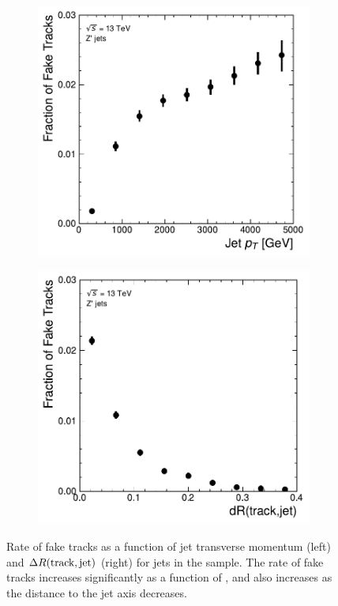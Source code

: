 \begin{figure}[!htbp]
  \centering
  \begin{subfigure}[b]{0.48\textwidth}
      \centering
      \includegraphics[width=\textwidth]{chapters/track_classifier/figs/fake_vs_pt.pdf}
  \end{subfigure}
  \quad
  \begin{subfigure}[b]{0.48\textwidth}
      \centering
      \includegraphics[width=\textwidth]{chapters/track_classifier/figs/fake_vs_dr.pdf}
  \end{subfigure}
  \caption{
    Rate of fake tracks as a function of jet transverse momentum (left) and $\Delta R(\textnormal{track}, \textnormal{jet})$ (right) for jets in the \Zprime sample.
    The rate of fake tracks increases significantly as a function of \pt, and also increases as the distance to the jet axis decreases.
  }
  \label{fig:fakerate_vs}
\end{figure}

